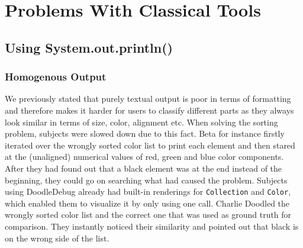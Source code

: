 \documentclass{acm_proc_article-sp}
\begin{document}
\section{Problems With Classical Tools}

\subsection{Using System.out.println()}
\subsubsection{Homogenous Output}
We previously stated that purely textual output is poor in terms of formatting and therefore makes it harder for users to classify different parts as they always look similar in terms of size, color, alignment etc.
When solving the sorting problem, subjects were slowed down due to this fact. Beta for instance firstly iterated over the wrongly sorted color list to print each element and then stared at the (unaligned) numerical values of red, green and blue color components. After they had found out that a black element was at the end instead of the beginning, they could go on searching what had caused the problem. Subjects using DoodleDebug already had built-in renderings for \verb.Collection. and \verb.Color., which enabled them to visualize it by only using one call. Charlie Doodled the wrongly sorted color list and the correct one that was used as ground truth for comparison. They instantly noticed their similarity and pointed out that black is on the wrong side of the list.
\end{document}
